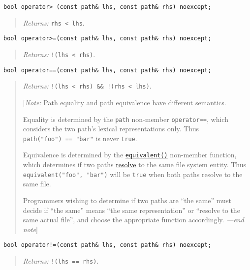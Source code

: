 \begin{verbatim}
bool operator> (const path& lhs, const path& rhs) noexcept;
\end{verbatim}

\begin{quote}
\emph{Returns:} \texttt{rhs\ \textless{}\ lhs}.
\end{quote}

\begin{verbatim}
bool operator>=(const path& lhs, const path& rhs) noexcept;
\end{verbatim}

\begin{quote}
\emph{Returns:} \texttt{!(lhs\ \textless{}\ rhs)}.
\end{quote}

\begin{verbatim}
bool operator==(const path& lhs, const path& rhs) noexcept;
\end{verbatim}

\begin{quote}
\emph{Returns:}
\texttt{!(lhs\ \textless{}\ rhs)\ \&\&\ !(rhs\ \textless{}\ lhs)}.

{[}\emph{Note:} Path equality and path equivalence have different
semantics.

Equality is determined by the \texttt{path} non-member
\texttt{operator==}, which considers the two path's lexical
representations only. Thus \texttt{path("foo")\ ==\ "bar"} is never
\texttt{true}.

Equivalence is determined by the
\hyperref[equivalent]{\texttt{equivalent()}} non-member function, which
determines if two paths \hyperref[class-path]{resolve} to the same file
system entity. Thus \texttt{equivalent("foo",\ "bar")} will be
\texttt{true} when both paths resolve to the same file.

Programmers wishing to determine if two paths are ``the same'' must
decide if ``the same'' means ``the same representation'' or ``resolve to
the same actual file'', and choose the appropriate function accordingly.
\emph{---end note}{]}
\end{quote}

\begin{verbatim}
bool operator!=(const path& lhs, const path& rhs) noexcept;
\end{verbatim}

\begin{quote}
\emph{Returns:} \texttt{!(lhs\ ==\ rhs)}.
\end{quote}

